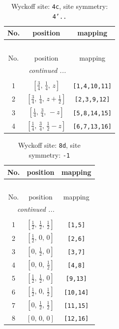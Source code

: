 \documentclass[fleqn,8pt]{jsarticle}
\begin{document}
\renewcommand{\arraystretch}{1.2}
\begin{longtable}{ccc}
\caption{Wyckoff site: {\tt 4c}, site symmetry: {\tt 4'..}}
 \\
 \hline \hline
No. & position & mapping \\ \hline \endfirsthead

\multicolumn{2}{l}{\tablename\ \thetable{}} \\
 \hline \hline
No. & position & mapping \\ \hline \endhead

 \hline \hline
\multicolumn{2}{r}{\footnotesize\it continued ...} \\ \endfoot

 \hline \hline
\multicolumn{2}{r}{} \\ \endlastfoot

1 & $\left[ \frac{3}{4},\, \frac{1}{4},\, z \right]$ & {\tt [1,4,10,11]} \\ \hline
2 & $\left[ \frac{3}{4},\, \frac{1}{4},\, z + \frac{1}{2} \right]$ & {\tt [2,3,9,12]} \\ \hline
3 & $\left[ \frac{1}{4},\, \frac{3}{4},\, - z \right]$ & {\tt [5,8,14,15]} \\ \hline
4 & $\left[ \frac{1}{4},\, \frac{3}{4},\, \frac{1}{2} - z \right]$ & {\tt [6,7,13,16]} \\
\end{longtable}
\renewcommand{\arraystretch}{1.2}
\begin{longtable}{ccc}
\caption{Wyckoff site: {\tt 8d}, site symmetry: {\tt -1}}
 \\
 \hline \hline
No. & position & mapping \\ \hline \endfirsthead

\multicolumn{2}{l}{\tablename\ \thetable{}} \\
 \hline \hline
No. & position & mapping \\ \hline \endhead

 \hline \hline
\multicolumn{2}{r}{\footnotesize\it continued ...} \\ \endfoot

 \hline \hline
\multicolumn{2}{r}{} \\ \endlastfoot

1 & $\left[ \frac{1}{2},\, \frac{1}{2},\, \frac{1}{2} \right]$ & {\tt [1,5]} \\ \hline
2 & $\left[ \frac{1}{2},\, 0,\, 0 \right]$ & {\tt [2,6]} \\ \hline
3 & $\left[ 0,\, \frac{1}{2},\, 0 \right]$ & {\tt [3,7]} \\ \hline
4 & $\left[ 0,\, 0,\, \frac{1}{2} \right]$ & {\tt [4,8]} \\ \hline
5 & $\left[ \frac{1}{2},\, \frac{1}{2},\, 0 \right]$ & {\tt [9,13]} \\ \hline
6 & $\left[ \frac{1}{2},\, 0,\, \frac{1}{2} \right]$ & {\tt [10,14]} \\ \hline
7 & $\left[ 0,\, \frac{1}{2},\, \frac{1}{2} \right]$ & {\tt [11,15]} \\ \hline
8 & $\left[ 0,\, 0,\, 0 \right]$ & {\tt [12,16]} \\
\end{longtable}
\end{document}
